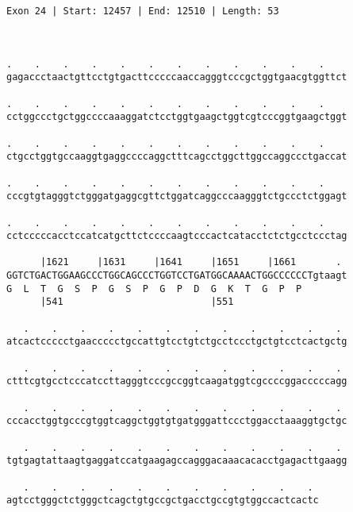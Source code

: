 \documentclass{article}
\begin{document}
\begin{Verbatim}
Exon 24 | Start: 12457 | End: 12510 | Length: 53



.    .    .    .    .    .    .    .    .    .    .    .    
gagaccctaactgttcctgtgacttcccccaaccagggtcccgctggtgaacgtggttct
                                                            
.    .    .    .    .    .    .    .    .    .    .    .    
cctggccctgctggccccaaaggatctcctggtgaagctggtcgtcccggtgaagctggt
                                                            
.    .    .    .    .    .    .    .    .    .    .    .    
ctgcctggtgccaaggtgaggccccaggctttcagcctggcttggccaggccctgaccat
                                                            
.    .    .    .    .    .    .    .    .    .    .    .    
cccgtgtagggtctgggatgaggcgttctggatcaggcccaagggtctgccctctggagt
                                                            
.    .    .    .    .    .    .    .    .    .    .    .    
cctcccccacctccatcatgcttctccccaagtcccactcatacctctctgcctccctag
                                                            
      |1621     |1631     |1641     |1651     |1661       . 
GGTCTGACTGGAAGCCCTGGCAGCCCTGGTCCTGATGGCAAAACTGGCCCCCCTgtaagt
G  L  T  G  S  P  G  S  P  G  P  D  G  K  T  G  P  P        
      |541                          |551                    
  
   .    .    .    .    .    .    .    .    .    .    .    . 
atcactccccctgaaccccctgccattgtcctgtctgcctccctgctgtcctcactgctg
                                                            
   .    .    .    .    .    .    .    .    .    .    .    . 
ctttcgtgcctcccatccttagggtcccgccggtcaagatggtcgccccggacccccagg
                                                            
   .    .    .    .    .    .    .    .    .    .    .    . 
cccacctggtgcccgtggtcaggctggtgtgatgggattccctggacctaaaggtgctgc
                                                            
   .    .    .    .    .    .    .    .    .    .    .    . 
tgtgagtattaagtgaggatccatgaagagccagggacaaacacacctgagacttgaagg
                                                            
   .    .    .    .    .    .    .    .    .    .    . 
agtcctgggctctgggctcagctgtgccgctgacctgccgtgtggccactcactc
                                                       

\end{Verbatim}
\end{document}
